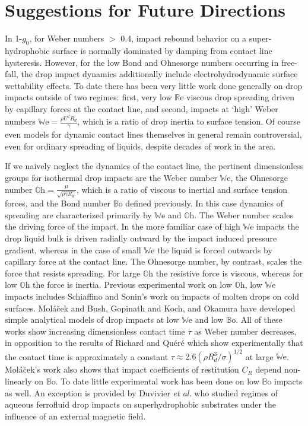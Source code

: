 \documentclass[12pt,a4paper,oneside]{book}
\begin{document}
\section{Suggestions for Future Directions}
In 1-$g_0$, for Weber numbers $>$ 0.4, impact rebound behavior on a super-hydrophobic surface is normally dominated by damping from contact line hysteresis. However, for the low Bond and Ohnesorge numbers occurring in free-fall, the drop impact dynamics additionally include electrohydrodynamic surface wettability effects. To date there has been very little work done generally on drop impacts outside of two regimes: first, very low $\mathbb{R}\mbox{e}$ viscous drop spreading driven by capillary forces at the contact line, and second, impacts at `high' Weber numbers $\mathbb{W}\mbox{e} = \frac{\rho U^2 R_d}{\gamma}$, which is a ratio of drop inertia to surface tension. Of course even models for dynamic contact lines themselves in general remain controversial, even for ordinary spreading of liquids, despite decades of work in the area. 

If we naively neglect the dynamics of the contact line, the pertinent dimensionless groups for isothermal drop impacts are the Weber number $\mathbb{W}\mbox{e}$, the Ohnesorge number $\mathbb{O}\mbox{h} = \frac{\mu}{\sqrt{\rho \gamma R_d}}$, which is a ratio of viscous to inertial and surface tension forces, and the Bond number $\mathbb{B}\mbox{o}$ defined previously. In this case dynamics of spreading are characterized primarily by $\mathbb{W}\mbox{e}$ and $\mathbb{O}\mbox{h}$. The Weber number scales the driving force of the impact. In the more familiar case of high $\mathbb{W}\mbox{e}$ impacts the drop liquid bulk is driven radially outward by the impact induced pressure gradient, whereas in the case of small $\mathbb{W}\mbox{e}$ the liquid is forced outwards by capillary force at the contact line. The Ohnesorge number, by contrast, scales the force that resists spreading. For large $\mathbb{O}\mbox{h}$ the resistive force is viscous, whereas for low $\mathbb{O}\mbox{h}$ the force is inertia. Previous experimental work on low $\mathbb{O}\mbox{h}$, low $\mathbb{W}\mbox{e}$ impacts includes Schiaffino and Sonin's work\cite{schiaffino_molten_1997} on impacts of molten drops on cold surfaces. Mol\'{a}\u{c}ek and Bush\cite{molacek_quasi-static_2012}, Gopinath and Koch\cite{gopinath_collision_2002}, and Okamura\cite{okumura_water_2003} have developed simple analytical models of drop impacts at low $\mathbb{W}\mbox{e}$ and low $\mathbb{B}\mbox{o}$. All of these works show increasing dimensionless contact time $\tau$ as Weber number decreases, in opposition to the results of Richard and Qu\'{e}r\'{e} \cite{richard_surface_2002} which show experimentally that the contact time is approximately a constant $\tau \approx 2.6(\rho R^3_d/\sigma)^{1/2}$ at large $\mathbb{W}\mbox{e}$. Mol\'{a}\u{c}ek's work also shows that impact coefficients of restitution $C_R$ depend non-linearly on $\mathbb{B}\mbox{o}$. To date little experimental work has been done on low $\mathbb{B}\mbox{o}$ impacts as well. An exception is provided by Duvivier \emph{et al.}\cite{duvivier_drop_2012} who studied regimes of aqueous ferrofluid drop impacts on superhydrophobic substrates under the influence of an external magnetic field. 
\end{document}
